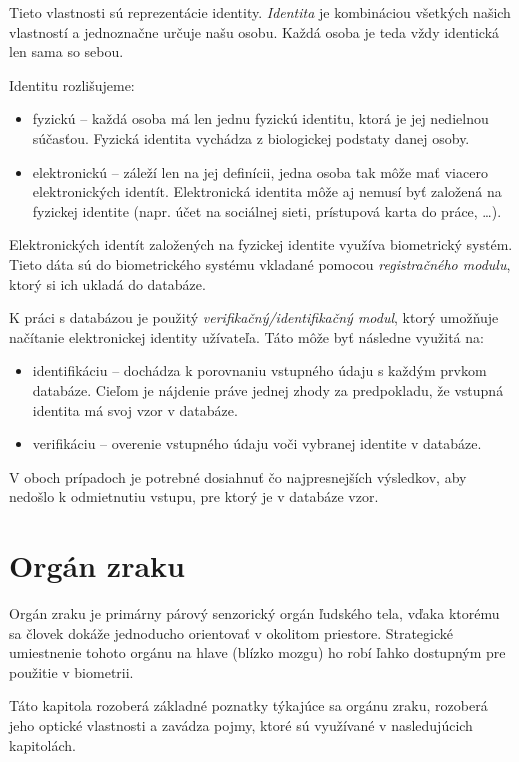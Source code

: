 Tieto vlastnosti sú reprezentácie identity. \emph{Identita} je kombináciou všetkých našich vlastností a jednoznačne určuje našu osobu. Každá osoba je teda vždy identická len sama so sebou\cite{bio}.

Identitu rozlišujeme:
\begin{itemize}
\item fyzickú -- každá osoba má len jednu fyzickú identitu, ktorá je jej nedielnou súčasťou. Fyzická identita vychádza z biologickej podstaty danej osoby.
\item elektronickú -- záleží len na jej definícii, jedna osoba tak môže mať viacero elektronických identít. Elektronická identita môže aj nemusí byť založená na fyzickej identite (napr. účet na sociálnej sieti, prístupová karta do práce, \dots).
\end{itemize}

Elektronických identít založených na fyzickej identite využíva biometrický systém. Tieto dáta sú do biometrického systému vkladané pomocou \emph{registračného modulu}, ktorý si ich ukladá do databáze.

K práci s databázou je použitý \emph{verifikačný/identifikačný modul}, ktorý umožňuje načítanie elektronickej identity užívateľa. Táto môže byť následne využitá na:
\begin{itemize}
\item identifikáciu -- dochádza k porovnaniu vstupného údaju s každým prvkom databáze. Cieľom je nájdenie práve jednej zhody za predpokladu, že vstupná identita má svoj vzor v databáze.
\item verifikáciu -- overenie vstupného údaju voči vybranej identite v databáze.
\end{itemize}

V oboch prípadoch je potrebné dosiahnuť čo najpresnejších výsledkov, aby nedošlo k odmietnutiu vstupu, pre ktorý je v databáze vzor.



\chapter{Orgán zraku}\label{ch:kap1}
Orgán zraku je primárny párový senzorický orgán ľudského tela, vďaka ktorému sa človek dokáže jednoducho orientovať v okolitom priestore. Strategické umiestnenie tohoto orgánu na hlave (blízko mozgu) ho robí ľahko dostupným pre použitie v biometrii.

Táto kapitola rozoberá základné poznatky týkajúce sa orgánu zraku, rozoberá jeho optické vlastnosti a zavádza pojmy, ktoré sú využívané v nasledujúcich kapitolách.

